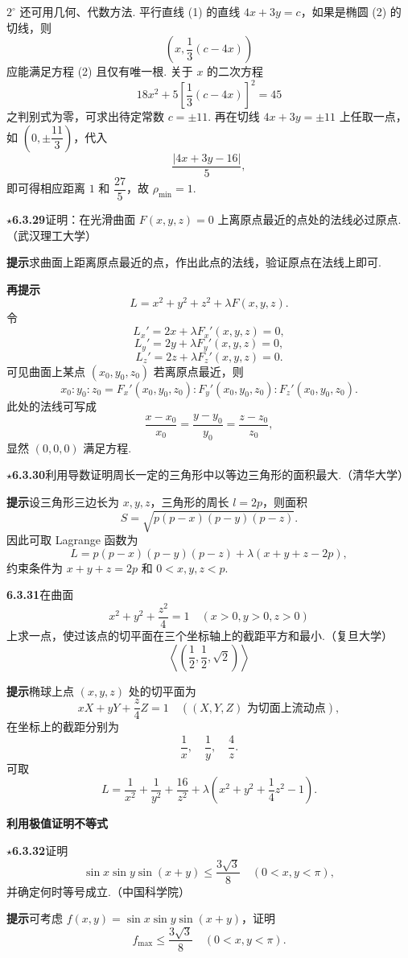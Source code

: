\documentclass[UTF8, 12pt, fontset=fandol, oneside]{ctexart}
\begin{document}
$2^\circ$ 还可用几何、代数方法. 平行直线 (1) 的直线 $4x+3y=c$，如果是椭圆 (2) 的切线，则
\[
  \left(x,\frac13(c-4x)\right)
\]
应能满足方程 (2) 且仅有唯一根. 关于 $x$ 的二次方程
\[
  18x^2+5\left[\frac13(c-4x)\right]^2=45
\]
之判别式为零，可求出待定常数 $c=\pm11$. 再在切线 $4x+3y=\pm11$ 上任取一点，如 $\left(0,\pm\dfrac{11}{3}\right)$，代入
\[
  \frac{|4x+3y-16|}{5},
\]
即可得相应距离 $1$ 和 $\dfrac{27}{5}$，故 $\rho_{\min}=1$.

\noindent\textbf{\ensuremath{\star}6.3.29}\quad 证明：在光滑曲面 $F(x,y,z)=0$ 上离原点最近的点处的法线必过原点.（武汉理工大学）

\noindent\textbf{提示}\quad 求曲面上距离原点最近的点，作出此点的法线，验证原点在法线上即可.

\noindent\textbf{再提示}\quad
\[
  L=x^2+y^2+z^2+\lambda F(x,y,z).
\]
令
\[
  L_x'=2x+\lambda F_x'(x,y,z)=0,
\]
\[
  L_y'=2y+\lambda F_y'(x,y,z)=0,
\]
\[
  L_z'=2z+\lambda F_z'(x,y,z)=0.
\]
可见曲面上某点 $(x_0,y_0,z_0)$ 若离原点最近，则
\[
  x_0:y_0:z_0=F_x'(x_0,y_0,z_0):F_y'(x_0,y_0,z_0):F_z'(x_0,y_0,z_0).
\]
此处的法线可写成
\[
  \frac{x-x_0}{x_0}=\frac{y-y_0}{y_0}=\frac{z-z_0}{z_0},
\]
显然 $(0,0,0)$ 满足方程.

\noindent\textbf{\ensuremath{\star}6.3.30}\quad 利用导数证明周长一定的三角形中以等边三角形的面积最大.（清华大学）

\noindent\textbf{提示}\quad 设三角形三边长为 $x,y,z$，三角形的周长 $l=2p$，则面积
\[
  S=\sqrt{p(p-x)(p-y)(p-z)}.
\]
因此可取 Lagrange 函数为
\[
  L=p(p-x)(p-y)(p-z)+\lambda(x+y+z-2p),
\]
约束条件为 $x+y+z=2p$ 和 $0<x,y,z<p$.

\noindent\textbf{6.3.31}\quad 在曲面
\[
  x^2+y^2+\frac{z^2}{4}=1\quad(x>0,y>0,z>0)
\]
上求一点，使过该点的切平面在三个坐标轴上的截距平方和最小.（复旦大学）
\[
  \left\langle\left(\frac12,\frac12,\sqrt2\right)\right\rangle
\]

\noindent\textbf{提示}\quad 椭球上点 $(x,y,z)$ 处的切平面为
\[
  xX+yY+\frac{z}{4}Z=1\quad((X,Y,Z)\text{ 为切面上流动点}),
\]
在坐标上的截距分别为
\[
  \frac1x,\quad \frac1y,\quad \frac4z.
\]
可取
\[
  L=\frac1{x^2}+\frac1{y^2}+\frac{16}{z^2}
  +\lambda\left(x^2+y^2+\frac14z^2-1\right).
\]

\noindent\textbf{利用极值证明不等式}

\noindent\textbf{\ensuremath{\star}6.3.32}\quad 证明
\[
  \sin x\sin y\sin(x+y)\le\frac{3\sqrt3}{8}\quad(0<x,y<\pi),
\]
并确定何时等号成立.（中国科学院）

\noindent\textbf{提示}\quad 可考虑 $f(x,y)=\sin x\sin y\sin(x+y)$，证明
\[
  f_{\max}\le\frac{3\sqrt3}{8}\quad(0<x,y<\pi).
\]
\end{document}
